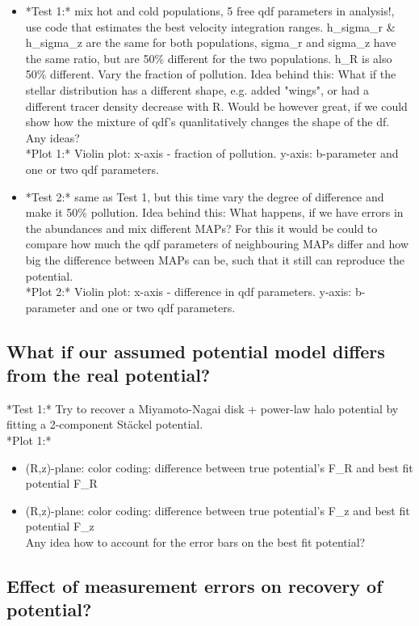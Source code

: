 \documentclass[12pt,preprint]{aastex}
\begin{document}
\begin{itemize}
\item *Test 1:* mix hot and cold populations, 5 free qdf parameters in analysis!, use code that estimates the best velocity integration ranges. h\_sigma\_r \& h\_sigma\_z are the same for both populations, sigma\_r and sigma\_z have the same ratio, but are 50\% different for the two populations. h\_R is also 50\% different. Vary the fraction of pollution. Idea behind this: What if the stellar distribution has a different shape, e.g. added "wings", or had a different tracer density decrease with R. Would be however great, if we could show how the mixture of qdf's quanlitatively changes the shape of the df. Any ideas? \\
*Plot 1:* Violin plot: x-axis - fraction of pollution. y-axis: b-parameter and one or two qdf parameters.
\item *Test 2:* same as Test 1, but this time vary the degree of difference and make it 50\% pollution. Idea behind this: What happens, if we have errors in the abundances and mix different MAPs? For this it would be could to compare how much the qdf parameters of neighbouring MAPs differ and how big the difference between MAPs can be, such that it still can reproduce the potential. \\
*Plot 2:* Violin plot: x-axis - difference in qdf parameters. y-axis: b-parameter and one or two qdf parameters.
\end{itemize}

\subsection{What if our assumed potential model differs from the real potential?}

*Test 1:* Try to recover a Miyamoto-Nagai disk + power-law halo potential by fitting a 2-component St\"ackel potential. \\
*Plot 1:* 
\begin{itemize}
   \item (R,z)-plane: color coding: difference between true potential's F\_R and best fit potential F\_R
    \item (R,z)-plane: color coding: difference between true potential's F\_z and best fit potential F\_z \\
    Any idea how to account for the error bars on the best fit potential?
\end{itemize}

\subsection{Effect of measurement errors on recovery of potential?}
\end{document}
